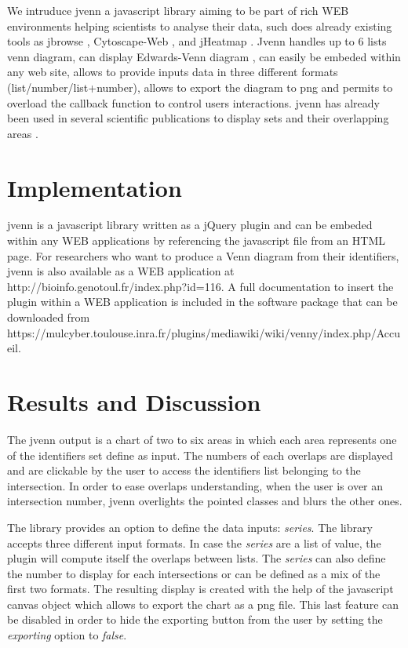 \documentclass{bmcart}
\begin{document}
We intruduce jvenn a javascript library aiming to be part of rich WEB environments helping scientists to analyse 
their data, such does already existing tools as jbrowse \cite{Westesson01032013}, Cytoscape-Web \cite{Lopes2010}, 
and jHeatmap \cite{DeuPons2014}. Jvenn handles up to 6 lists venn diagram, can display Edwards-Venn diagram
\cite{Edwards2004}, can easily be embeded within any web site, allows to provide inputs data in three different formats 
(list/number/list+number), allows to export the diagram to png and permits to overload the callback 
function to control users interactions. jvenn has already been used in several scientific publications to display 
sets and their overlapping areas \cite{Bianchia2013, Aravindraja2013}. 


\section*{Implementation}

jvenn is a javascript library written as a jQuery plugin \cite{jquery} and can be embeded within any WEB applications 
by referencing the javascript file from an HTML page. For researchers who want to produce a Venn diagram from their 
identifiers, jvenn is also available as a WEB application at http://bioinfo.genotoul.fr/index.php?id=116. A full 
documentation to insert the plugin within a WEB application is included in the software package that can be downloaded 
from https://mulcyber.toulouse.inra.fr/plugins/mediawiki/wiki/venny/index.php/Accueil.


\section*{Results and Discussion}

The jvenn output is a chart of two to six areas in which each area represents one of the identifiers set define as input. 
The numbers of each overlaps are displayed and are clickable by the user to access the identifiers list belonging to the 
intersection. In order to ease overlaps understanding, when the user is over an intersection number, jvenn overlights the 
pointed classes and blurs the other ones.

The library provides an option to define the data inputs: \textit{series}. The library accepts three different input formats. 
In case the \textit{series} are a list of value, the plugin will compute itself the overlaps between lists. The \textit{series} 
can also define the number to display for each intersections or can be defined as a mix of the first two formats. 
The resulting display is created with the help of the javascript canvas object which allows to export the chart as a png file. 
This last feature can be disabled in order to hide the exporting button from the user by setting the \textit{exporting} option 
to \textit{false}.
\end{document}
